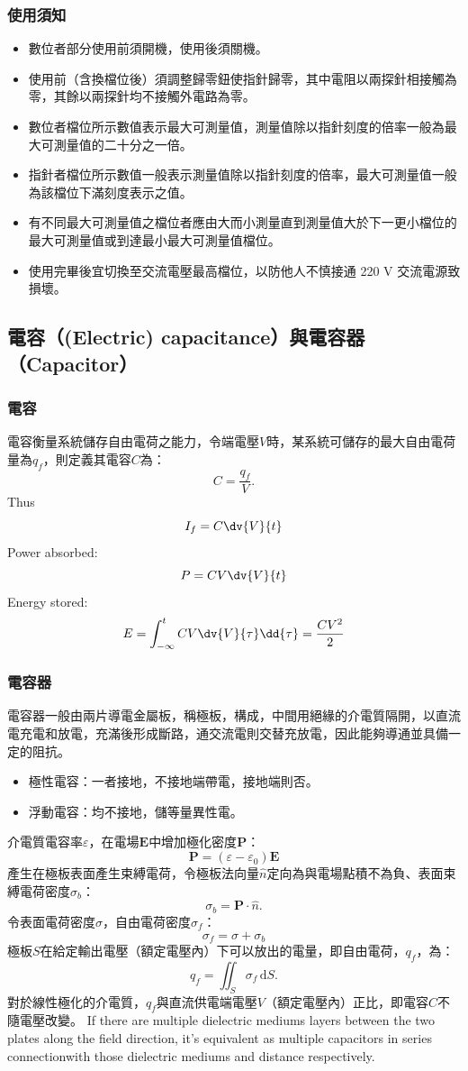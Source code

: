 \documentclass[a4paper,12pt]{report}
\begin{document}
\begin{itemize}
\subsubsection{使用須知}
\begin{itemize}
\item 數位者部分使用前須開機，使用後須關機。
\item 使用前（含換檔位後）須調整歸零鈕使指針歸零，其中電阻以兩探針相接觸為零，其餘以兩探針均不接觸外電路為零。
\item 數位者檔位所示數值表示最大可測量值，測量值除以指針刻度的倍率一般為最大可測量值的二十分之一倍。
\item 指針者檔位所示數值一般表示測量值除以指針刻度的倍率，最大可測量值一般為該檔位下滿刻度表示之值。
\item 有不同最大可測量值之檔位者應由大而小測量直到測量值大於下一更小檔位的最大可測量值或到達最小最大可測量值檔位。
\item 使用完畢後宜切換至交流電壓最高檔位，以防他人不慎接通 220 V 交流電源致損壞。
\end{itemize}
\subsection{電容（(Electric) capacitance）與電容器（Capacitor）}
\subsubsection{電容}
電容衡量系統儲存自由電荷之能力，令端電壓$V$時，某系統可儲存的最大自由電荷量為$q_f$，則定義其電容$C$為：
\[C=\frac{q_f}{V}.\]
Thus
\[I_f=C\dv{V}{t}\]
Power absorbed:
\[P=CV\dv{V}{t}\]
Energy stored:
\[E=\int_{-\infty}^tCV\dv{V}{\tau}\dd{\tau}=\frac{CV^2}{2}\]
\subsubsection{電容器}
電容器一般由兩片導電金屬板，稱極板，構成，中間用絕緣的介電質隔開，以直流電充電和放電，充滿後形成斷路，通交流電則交替充放電，因此能夠導通並具備一定的阻抗。
\begin{itemize}
\item 極性電容：一者接地，不接地端帶電，接地端則否。
\item 浮動電容：均不接地，儲等量異性電。
\end{itemize}
介電質電容率$\varepsilon$，在電場$\mathbf{E}$中增加極化密度$\mathbf{P}$：
\[\mathbf{P}=(\varepsilon-\varepsilon_0)\mathbf{E}\]
產生在極板表面產生束縛電荷，令極板法向量$\hat{n}$定向為與電場點積不為負、表面束縛電荷密度$\sigma_b$：
\[\sigma_b = \mathbf{P}\cdot\hat{n}.\]
令表面電荷密度$\sigma$，自由電荷密度$\sigma_f$：
\[\sigma_f=\sigma+\sigma_b\]
極板$S$在給定輸出電壓（額定電壓內）下可以放出的電量，即自由電荷，$q_f$，為：
\[q_f=\iint_S\sigma_f\,\mathrm{d}S.\]
對於線性極化的介電質，$q_f$與直流供電端電壓$V$（額定電壓內）正比，即電容$C$不隨電壓改變。
If there are multiple dielectric mediums layers between the two plates along the field direction, it's equivalent as multiple capacitors in series connectionwith those dielectric mediums and distance respectively.


\end{itemize}
\end{document}
